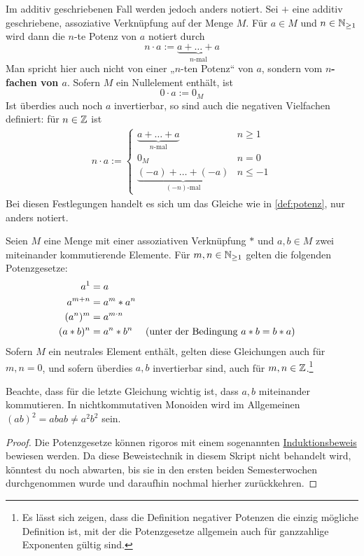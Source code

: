     
\begin{nota}
    Im additiv geschriebenen Fall werden jedoch anders notiert. Sei $+$ eine additiv geschriebene, assoziative Verknüpfung auf der Menge $M$. Für $a\in M$ und $n\in \mathbb N_{\ge 1}$ wird dann die $n$-te Potenz von $a$ notiert durch
        \[ n \cdot a := \underbrace{a + \ldots + a}_{n\text{-mal}} \]
    Man spricht hier auch nicht von einer „$n$-ten Potenz“ von $a$, sondern vom \textbf{$n$-fachen von $a$}. Sofern $M$ ein Nullelement enthält, ist
        \[ 0\cdot a := 0_M \]
    Ist überdies auch noch $a$ invertierbar, so sind auch die negativen Vielfachen definiert: für $n\in \mathbb Z$ ist
    \begin{align*}
        n \cdot a := \begin{cases}
            \underbrace{a+ \ldots + a}_{n\text{-mal}} & n \ge 1 \\
            0_M & n= 0 \\
            \underbrace{(-a) + \ldots +  (-a)}_{(-n)\text{-mal}} & n \le -1
        \end{cases}
    \end{align*}
    Bei diesen Festlegungen handelt es sich um das Gleiche wie in \cref{def:potenz}, nur anders notiert.
\end{nota}


\begin{satz}[* Potenzgesetze] \label{potenzgesetze}
    Seien $M$ eine Menge mit einer assoziativen Verknüpfung $*$ und $a,b\in M$ zwei miteinander kommutierende Elemente. Für $m,n\in \mathbb N_{\ge 1}$ gelten die folgenden Potenzgesetze:
    \begin{align*}
        a^1 & = a \\
        a^{m+n} & = a^m* a^n \\
        (a^n)^m & = a^{m\cdot n} \\
        (a*b)^n &= a^n*b^n && (\textnormal{unter der Bedingung $a*b=b*a$})
    \end{align*}
    Sofern $M$ ein neutrales Element enthält, gelten diese Gleichungen auch für $m,n=0$, und sofern überdies $a,b$ invertierbar sind, auch für $m,n\in \mathbb Z$.\footnote{Es lässt sich zeigen, dass die Definition negativer Potenzen die einzig mögliche Definition ist, mit der die Potenzgesetze allgemein auch für ganzzahlige Exponenten gültig sind.}
\end{satz}
\noindent Beachte, dass für die letzte Gleichung wichtig ist, dass $a,b$ miteinander kommutieren. In nichtkommutativen Monoiden wird im Allgemeinen $(ab)^2=abab\neq a^2b^2$ sein.
\begin{proof}
    Die Potenzgesetze können rigoros mit einem sogenannten \href{https://de.wikipedia.org/wiki/Vollst\%C3\%A4ndige_Induktion}{Induktionsbeweis} bewiesen werden. Da diese Beweistechnik in diesem Skript nicht behandelt wird, könntest du noch abwarten, bis sie in den ersten beiden Semesterwochen durchgenommen wurde und daraufhin nochmal hierher zurückkehren.
\end{proof}


